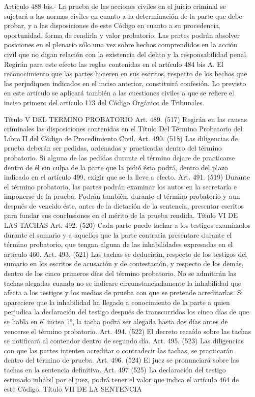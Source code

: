     Artículo 488 bis.- La prueba de las acciones civiles en el juicio criminal se sujetará a las normas civiles en cuanto a la determinación de la parte que debe probar, y a las disposiciones de este Código en cuanto a su procedencia, oportunidad, forma de rendirla y valor probatorio.
    Las partes podrán absolver posiciones en el plenario sólo una vez sobre hechos comprendidos en la acción civil que no digan relación con la existencia del delito y la responsabilidad penal. Regirán para este efecto las reglas contenidas en el artículo 484 bis A.
    El reconocimiento que las partes hicieren en sus escritos, respecto de los hechos que las perjudiquen indicados en el inciso anterior, constituirá confesión.
    Lo previsto en este artículo se aplicará también a las cuestiones civiles a que se refiere el inciso primero del artículo 173 del Código Orgánico de Tribunales.

    Título V
    DEL TERMINO PROBATORIO
    Art. 489. (517) Regirán en las causas criminales las disposiciones contenidas en el Título Del Término Probatorio del Libro II del Código de Procedimiento Civil.
    Art. 490. (518) Las diligencias de prueba deberán ser pedidas, ordenadas y practicadas dentro del término probatorio. Si alguna de las pedidas durante el término dejare de practicarse dentro de él sin culpa de la parte que la pidió ésta podrá, dentro del plazo indicado en el artículo 499, exigir que se la lleve a efecto.
    Art. 491. (519) Durante el término probatorio, las partes podrán examinar los autos en la secretaría e imponerse de la prueba.
    Podrán también, durante el término probatorio y aun después de vencido éste, antes de la dictación de la sentencia, presentar escritos para fundar sus conclusiones en el mérito de la prueba rendida.
    Título VI
    DE LAS TACHAS
    Art. 492. (520) Cada parte puede tachar a los testigos examinados durante el sumario y a aquellos que la parte contraria presentare durante el término probatorio, que tengan alguna de las inhabilidades expresadas en el artículo 460.
    Art. 493. (521) Las tachas se deducirán, respecto de los testigos del sumario en los escritos de acusación y de contestación, y respecto de los demás, dentro de los cinco primeros días del término probatorio.
    No se admitirán las tachas alegadas cuando no se indicare circunstanciadamente la inhabilidad que afecta a los testigos y los medios de prueba con que se pretende acreditarlas.
    Si apareciere que la inhabilidad ha llegado a conocimiento de la parte a quien perjudica la declaración del testigo después de transcurridos los cinco días de que se habla en el inciso 1°, la tacha podrá ser alegada hasta dos días antes de vencerse el término probatorio.
    Art. 494. (522) El decreto recaído sobre las tachas se notificará al contendor dentro de segundo día.
    Art. 495. (523) Las diligencias con que las partes intenten acreditar o contradecir las tachas, se practicarán dentro del término de prueba.
    Art. 496. (524) El juez se pronunciará sobre las tachas en la sentencia definitiva.
    Art. 497 (525) La declaración del testigo estimado inhábil por el juez, podrá tener el valor que indica el artículo 464 de este Código.
    Título VII
    DE LA SENTENCIA

